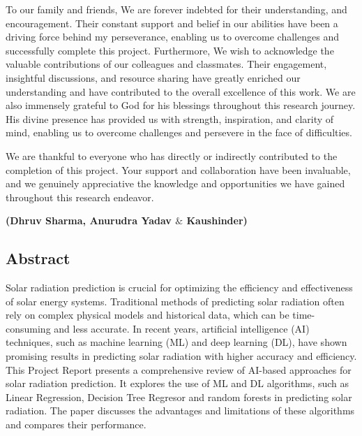 \documentclass[12pt,a4paper]{report}
\begin{document}
\par	
To our family and friends, We are forever indebted for their understanding, and encouragement. Their constant support and belief in our abilities have been a driving force behind my perseverance, enabling us to overcome challenges and successfully complete this project. Furthermore, We wish to acknowledge the valuable contributions of our colleagues and classmates. Their engagement, insightful discussions, and resource sharing have greatly enriched our understanding and have contributed to the overall excellence of this work.  We are also immensely grateful to God for his blessings throughout this research journey. His divine presence has provided us with strength, inspiration, and clarity of mind, enabling us to overcome challenges and persevere in the face of difficulties.	
\par
We are thankful to everyone who has directly or indirectly contributed to the completion of this project. Your support and collaboration have been invaluable, and we genuinely appreciative the knowledge and opportunities we have gained throughout this research endeavor.
\begin{flushright}
\vspace{40pt}
	\textbf{(Dhruv Sharma, Anurudra Yadav $\&$ Kaushinder)}
\end{flushright}
\clearpage
\begin{center}
	\section*{Abstract}
	\noindent{\rule{\textwidth}{1.5pt}}
\end{center}
   Solar radiation prediction is crucial for optimizing the efficiency and effectiveness of solar energy systems. Traditional methods of predicting solar radiation often rely on complex physical models and historical data, which can be time-consuming and less accurate. In recent years, artificial intelligence (AI) techniques, such as machine learning (ML) and deep learning (DL), have shown promising results in predicting solar radiation with higher accuracy and 
efficiency. \\
This Project Report presents a comprehensive review of AI-based approaches for solar radiation prediction. It explores the use of ML and DL algorithms, such as Linear Regression, Decision Tree Regresor and random forests in predicting solar radiation. The paper discusses the advantages and limitations of these algorithms and compares their performance. \\
\end{document}
